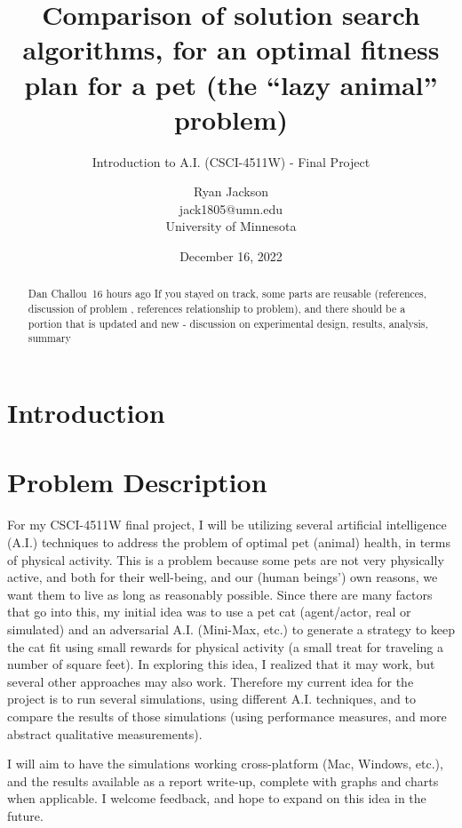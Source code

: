 \documentclass{article}
\title{Comparison of solution search algorithms, for an optimal fitness plan for a pet (the ``lazy animal'' problem)}
\subtitle{Introduction to A.I. (CSCI-4511W) - Final Project}
\author{Ryan Jackson \\ jack1805@umn.edu \\ University of Minnesota}
\date{December 16, 2022}
\begin{document}
\maketitle

\begin{abstract}
    Dan Challou 16 hours ago
If you stayed on track, some parts are reusable (references, discussion of problem , references relationship to problem), and there should be a  portion that is updated and new - discussion on experimental design, results, analysis, summary 
\end{abstract}

\section{Introduction}

\section{Problem Description}

For my CSCI-4511W final project, I will be utilizing several artificial intelligence (A.I.) techniques to address the problem of optimal pet (animal) health, in terms of physical activity. This is a problem because some pets are not very physically active, and both for their well-being, and our (human beings') own reasons, we want them to live as long as reasonably possible. Since there are many factors that go into this, my initial idea was to use a pet cat (agent/actor, real or simulated) and an adversarial A.I. (Mini-Max, etc.) to generate a strategy to keep the cat fit using small rewards for physical activity (a small treat for traveling a number of square feet). In exploring this idea, I realized that it may work, but several other approaches may also work. Therefore my current idea for the project is to run several simulations, using different A.I. techniques, and to compare the results of those simulations (using performance measures, and more abstract qualitative measurements).

I will aim to have the simulations working cross-platform (Mac, Windows, etc.), and the results available as a report write-up, complete with graphs and charts when applicable. I welcome feedback, and hope to expand on this idea in the future.
\end{document}
